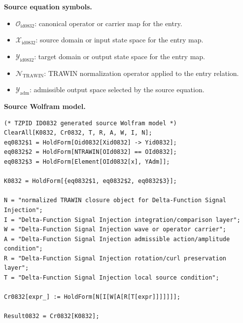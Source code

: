 \begin{minipage}[t]{0.49\linewidth}
\begingroup
\small
\raggedright
\textbf{Source equation symbols.}\par
\begin{itemize}[leftmargin=1.35em,itemsep=1pt,topsep=1pt,parsep=0pt]
    \item $\mathcal{O}_{\mathrm{id0832}}$: canonical operator or carrier map for the entry.
    \item $\mathcal{X}_{\mathrm{id0832}}$: source domain or input state space for the entry map.
    \item $\mathcal{Y}_{\mathrm{id0832}}$: target domain or output state space for the entry map.
    \item $\mathcal{N}_{\mathrm{TRAWIN}}$: TRAWIN normalization operator applied to the entry relation.
    \item $\mathcal{Y}_{\mathrm{adm}}$: admissible output space selected by the source equation.
\end{itemize}
\endgroup
\end{minipage}\hfill
\begin{minipage}[t]{0.47\linewidth}
\begingroup
\scriptsize
\raggedright
\textbf{Source Wolfram model.}\par
\begin{Verbatim}[fontsize=\tiny,breaklines=true,breakanywhere=true]
(* TZPID ID0832 generated source Wolfram model *)
ClearAll[K0832, Cr0832, T, R, A, W, I, N];
eq0832$1 = HoldForm[Oid0832[Xid0832] -> Yid0832];
eq0832$2 = HoldForm[NTRAWIN[OId0832] == OId0832];
eq0832$3 = HoldForm[Element[OId0832[x], YAdm]];

K0832 = HoldForm[{eq0832$1, eq0832$2, eq0832$3}];

N = "normalized TRAWIN closure object for Delta-Function Signal Injection";
I = "Delta-Function Signal Injection integration/comparison layer";
W = "Delta-Function Signal Injection wave or operator carrier";
A = "Delta-Function Signal Injection admissible action/amplitude condition";
R = "Delta-Function Signal Injection rotation/curl preservation layer";
T = "Delta-Function Signal Injection local source condition";

Cr0832[expr_] := HoldForm[N[I[W[A[R[T[expr]]]]]]];

Result0832 = Cr0832[K0832];
\end{Verbatim}
\endgroup
\end{minipage}

